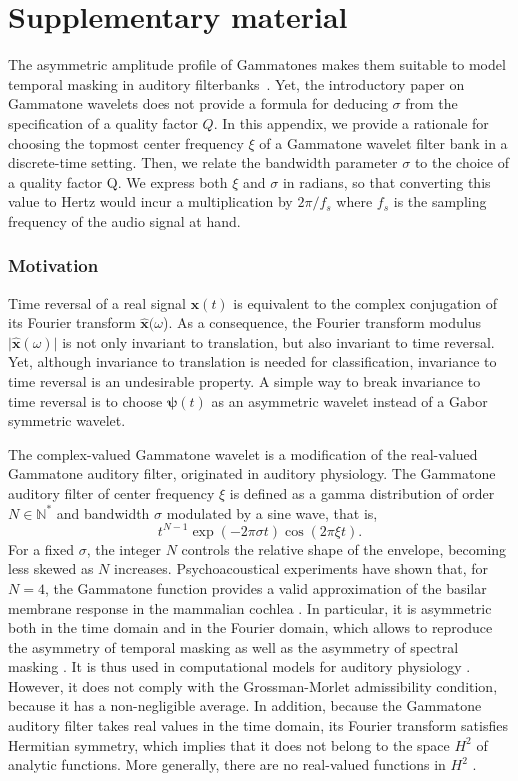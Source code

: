 \documentclass[smallextended]{svjour3}
\begin{document}
\section{Supplementary material}

The asymmetric amplitude profile of Gammatones makes them suitable to model temporal masking in auditory filterbanks~\cite{Fastl2007}.
Yet, the introductory paper on Gammatone wavelets \cite{Venkitaraman2014} does not provide a formula for deducing $\sigma$ from the specification of a quality factor $Q$.
In this appendix, we provide a rationale for choosing the topmost center frequency $\xi$ of a Gammatone wavelet filter bank in a discrete-time setting.
Then, we relate the bandwidth parameter $\sigma$ to the choice of a quality factor Q.
We express both $\xi$ and $\sigma$ in radians, so that converting this value to Hertz would incur a multiplication by $2\pi/f_s$ where $f_s$ is the sampling frequency of the audio signal at hand.


\subsubsection*{Motivation}
Time reversal of a real signal $\boldsymbol{x}(t)$ is equivalent
to the complex conjugation of its Fourier transform $\boldsymbol{\widehat{x}}(\omega$).
As a consequence, the Fourier transform modulus $\vert\boldsymbol{\widehat{x}}(\omega)\vert$
is not only invariant to translation, but also invariant to time reversal.
Yet, although invariance to translation is needed for classification,
invariance to time reversal is an undesirable property.
A simple way to break invariance to time reversal is to choose $\boldsymbol{\psi}(t)$
as an asymmetric wavelet instead of a Gabor symmetric wavelet.

The complex-valued Gammatone wavelet is a modification of the real-valued
Gammatone auditory filter, originated in auditory physiology. The
Gammatone auditory filter of center frequency $\xi$ is defined
as a gamma distribution of order $N\in\mathbb{N}^{*}$ and bandwidth
$\sigma$ modulated by a sine wave, that is,
\[
t^{N-1}\exp(-2\pi\sigma t)\cos(2\pi \xi t).
\]
For a fixed $\sigma$, the integer $N$ controls the relative shape
of the envelope, becoming less skewed as $N$ increases. Psychoacoustical
experiments have shown that, for $N=4$, the Gammatone function provides
a valid approximation of the basilar membrane response in the mammalian
cochlea \cite{Flanagan1960,Patterson1976,Lyon2010}. In particular,
it is asymmetric both in the time domain and in the Fourier domain,
which allows to reproduce the asymmetry of temporal masking as well
as the asymmetry of spectral masking \cite{Fastl2007}. It is thus
used in computational models for auditory physiology \cite{Pressnitzer2005}.
However, it does not comply with the Grossman-Morlet admissibility
condition, because it has a non-negligible average. In addition, because
the Gammatone auditory filter takes real values in the time domain,
its Fourier transform satisfies Hermitian symmetry, which implies
that it does not belong to the space $H^{2}$ of analytic functions.
More generally, there are no real-valued functions in $H^{2}$ \cite{Grossmann1984}.
\end{document}
